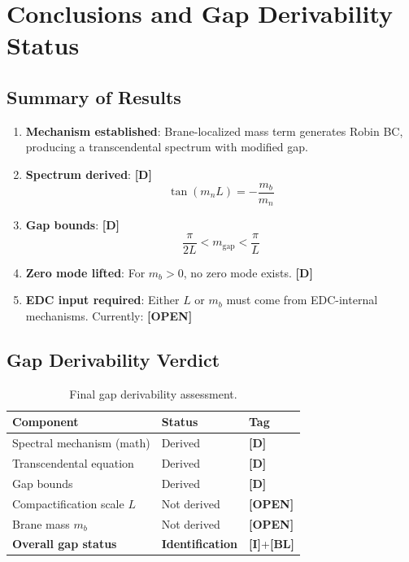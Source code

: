 \documentclass[11pt,a4paper]{article}
\newcommand{\mgap}{m_{\mathrm{gap}}}
\newcommand{\mb}{m_b}
\newcommand{\tagD}{\textbf{[D]}}
\newcommand{\tagI}{\textbf{[I]}}
\newcommand{\tagBL}{\textbf{[BL]}}
\newcommand{\tagOPEN}{\textbf{[OPEN]}}
\theoremstyle{definition}
\theoremstyle{plain}
\theoremstyle{remark}
\begin{document}
\section{Conclusions and Gap Derivability Status}
\label{sec:conclusions}

\subsection{Summary of Results}

\begin{enumerate}
\item \textbf{Mechanism established}: Brane-localized mass term generates Robin BC,
producing a transcendental spectrum with modified gap.

\item \textbf{Spectrum derived}: \tagD{}
\begin{equation}
\tan(m_n L) = -\frac{\mb}{m_n}
\label{eq:spectrum-final}
\end{equation}

\item \textbf{Gap bounds}: \tagD{}
\begin{equation}
\frac{\pi}{2L} < \mgap < \frac{\pi}{L}
\label{eq:gap-bounds-final}
\end{equation}

\item \textbf{Zero mode lifted}: For $\mb > 0$, no zero mode exists. \tagD{}

\item \textbf{EDC input required}: Either $L$ or $\mb$ must come from EDC-internal
mechanisms. Currently: \tagOPEN{}
\end{enumerate}

\subsection{Gap Derivability Verdict}

\begin{table}[htbp]
\centering
\caption{Final gap derivability assessment.}
\label{tab:verdict}
\begin{tabular}{@{}lll@{}}
\toprule
Component & Status & Tag \\
\midrule
Spectral mechanism (math) & Derived & \tagD{} \\
Transcendental equation & Derived & \tagD{} \\
Gap bounds & Derived & \tagD{} \\
Compactification scale $L$ & Not derived & \tagOPEN{} \\
Brane mass $\mb$ & Not derived & \tagOPEN{} \\
\midrule
\textbf{Overall gap status} & \textbf{Identification} & \tagI{}+\tagBL{} \\
\bottomrule
\end{tabular}
\end{table}
\end{document}
